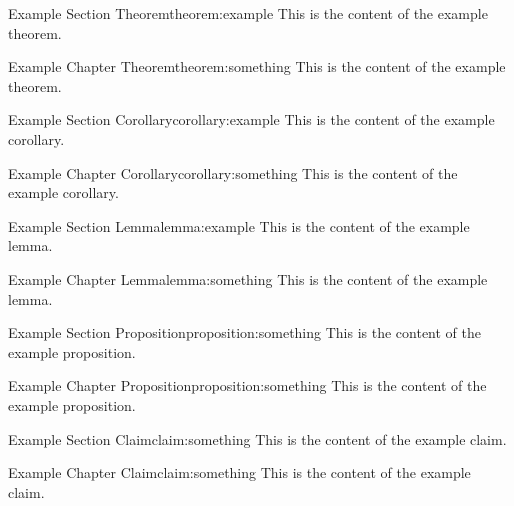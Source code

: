 \documentclass{report}
\begin{document}

\begin{section_theorem}{Example Section Theorem}{theorem:example}
    This is the content of the example theorem.
\end{section_theorem}

\begin{chapter_theorem}{Example Chapter Theorem}{theorem:something}
    This is the content of the example theorem.
\end{chapter_theorem}

\begin{section_corollary}{Example Section Corollary}{corollary:example}
    This is the content of the example corollary.
\end{section_corollary}

\begin{chapter_corollary}{Example Chapter Corollary}{corollary:something}
    This is the content of the example corollary.
\end{chapter_corollary}

\begin{section_lemma}{Example Section Lemma}{lemma:example}
    This is the content of the example lemma.
\end{section_lemma}

\begin{chapter_lemma}{Example Chapter Lemma}{lemma:something}
    This is the content of the example lemma.
\end{chapter_lemma}

\begin{section_proposition}{Example Section Proposition}{proposition:something}
    This is the content of the example proposition.
\end{section_proposition}

\begin{chapter_proposition}{Example Chapter Proposition}{proposition:something}
    This is the content of the example proposition.
\end{chapter_proposition}

\begin{section_claim}{Example Section Claim}{claim:something}
    This is the content of the example claim.
\end{section_claim}

\begin{chapter_claim}{Example Chapter Claim}{claim:something}
    This is the content of the example claim.
\end{chapter_claim}
\end{document}
